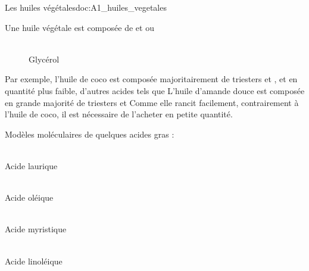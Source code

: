 \begin{doc}{Les huiles végétales}{doc:A1_huiles_vegetales}
  \begin{importants}
    Une huile végétale est composée de  et   ou 
  \end{importants}
  
  \begin{wrapfigure}{r}{0.22\linewidth}
    \centering
     \\[4pt]
    {\small Glycérol}
  \end{wrapfigure}
  
  Par exemple, l'huile de coco est composée majoritairement de triesters  et , et en quantité plus faible, d'autres acides tels que 
  L'huile d'amande douce est composée en grande majorité de triesters  et 
  Comme elle rancit facilement, contrairement à l'huile de coco, il est nécessaire de l'acheter en petite quantité.
  
  \begin{center}
    Modèles moléculaires de quelques acides gras :
  \end{center}
  \vspace*{-24pt}
  \begin{multicols}{2}
    \centering
     \\
    {\small Acide laurique}
    
     \\
    {\small Acide oléique}
    
     \\
    {\small Acide myristique}
    
     \\
    {\small Acide linoléique}
  \end{multicols}
\end{doc}



